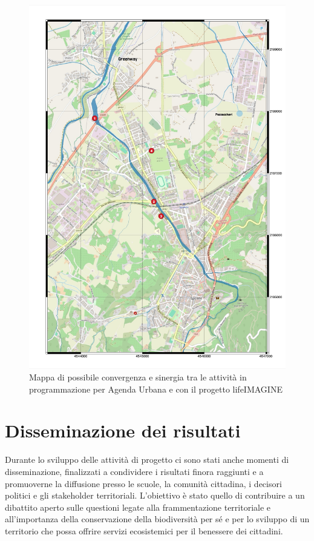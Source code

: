 \documentclass[
]{book}
\begin{document}
\begin{figure}

{\centering \includegraphics[width=\linewidth,height=\textheight]{./figs/agendaUrbana/Spoleto_AgendaUrbanalifeIMAGINE20250513} 

}

\caption{Mappa di possibile convergenza e sinergia tra le attività in programmazione per Agenda Urbana e con il progetto lifeIMAGINE}\label{fig:agULife}
\end{figure}

\chapter{Disseminazione dei risultati}\label{obs}

Durante lo sviluppo delle attività di progetto ci sono stati anche momenti di disseminazione, finalizzati a condividere i risultati finora raggiunti e a promuoverne la diffusione presso le scuole, la comunità cittadina, i decisori politici e gli stakeholder territoriali. L'obiettivo è stato quello di contribuire a un dibattito aperto sulle questioni legate alla frammentazione territoriale e all'importanza della conservazione della biodiversità per sé e per lo sviluppo di un territorio che possa offrire servizi ecosistemici per il benessere dei cittadini.
\end{document}
